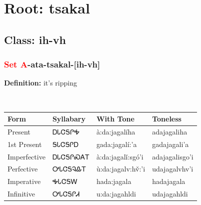 \needspace{4in}
\section*{Root: tsakal}
\nopagebreak
{}
\needspace{3in}
\subsection*{Class: ih-vh}
\nopagebreak
\needspace{2in}
\subsubsection*{\textcolor{Red}{Set A}{-}ata{-}\textbf{tsakal}{-}[ih-vh]}
\nopagebreak
\textbf{Definition: } it{\textquoteright}s ripping
\\[0.5em]
\begin{tabularx}{\textwidth}{l X X X}%
\toprule%
\textbf{Form}&\textbf{Syllabary}&\textbf{With Tone}&\textbf{Toneless}\\%
\midrule%
Present&ᎠᏓᏣᎦᎵᎭ&à:da:jagalíha&adajagaliha\\%
1st Present&ᎦᏓᏣᎦᎵᎠ&gada:jagalí:’a&gadajagali’a\\%
Imperfective&ᎠᏓᏣᎦᎵᏍᎪᎢ&à:da:jagalǐ:sgó’i&adajagalisgo’i\\%
Perfective&ᎤᏓᏣᎦᎸᎲᎢ&ù:da:jagalv:hv̌:’i&udajagalvhv’i\\%
Imperative&ᎭᏓᏣᎦᎳ&hada:jagala&hadajagala\\%
Infinitive&ᎤᏓᏣᎦᎵᏗ&u:da:jagahldi&udajagahldi\\%
\bottomrule%
\end{tabularx}
\\[1em]